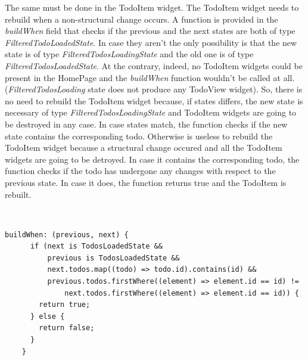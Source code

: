 The same must be done in the TodoItem widget. The TodoItem widget needs to rebuild when a non-structural change occurs. A function is provided in the \textit{buildWhen} field that checks if the previous and the next states are both of type \textit{FilteredTodoLoadedState}. In case they aren’t the only possibility is that the new state is of type \textit{FilteredTodosLoadingState} and the old one is of type \textit{FilteredTodosLoadedState}. At the contrary, indeed, no TodoItem widgets could be present in the HomePage and the \textit{buildWhen }function wouldn't be called at all. (\textit{FilteredTodosLoading} state does not produce any TodoView widget). So, there is no need to rebuild the TodoItem widget because, if states differs, the new state is necessary of type \textit{FilteredTodosLoadingState} and  TodoItem widgets are going to be destroyed in any case. In case states match, the function checks if the new state contains the corresponding todo. Otherwise is useless to rebuild the TodoItem widget because a structural change occured and all the TodoItem widgets are going to be detroyed. In case it contains the corresponding todo, the function checks if the todo has undergone any changes with respect to the previous state. In case it does, the function returns true and the TodoItem is rebuilt.
\begin{code}
\mbox{}\\
 \mbox{}
\label{code:2.14}
\begin{verbatim}
buildWhen: (previous, next) {
      if (next is TodosLoadedState &&
          previous is TodosLoadedState &&
          next.todos.map((todo) => todo.id).contains(id) &&
          previous.todos.firstWhere((element) => element.id == id) !=
              next.todos.firstWhere((element) => element.id == id)) {
        return true;
      } else {
        return false;
      }
    }
\end{verbatim}
\mbox{}
\end{code}

